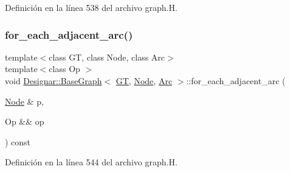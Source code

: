 Definición en la línea 538 del archivo graph.\+H.

\mbox{\label{class_designar_1_1_base_graph_a21553c1d96334e4cf2e0e2086e0efeba}} 
\subsubsection{\texorpdfstring{for\+\_\+each\+\_\+adjacent\+\_\+arc()}{for\_each\_adjacent\_arc()}\hspace{0.1cm}{\footnotesize\ttfamily [2/2]}}
{\footnotesize\ttfamily template$<$class GT, class Node, class Arc$>$ \\
template$<$class Op $>$ \\
void \hyperlink{class_designar_1_1_base_graph}{Designar\+::\+Base\+Graph}$<$ \hyperlink{demo-buildgraph_8_c_a3001c40d2c31ca87ed96cd7d1334a55e}{GT}, \hyperlink{namespace_designar_a5af326c65aa2bd26b26c410f2030d09e}{Node}, \hyperlink{namespace_designar_a3f55fb5513d62ff47cbc8f72b8e95d6f}{Arc} $>$\+::for\+\_\+each\+\_\+adjacent\+\_\+arc (\begin{DoxyParamCaption}\item[{\hyperlink{namespace_designar_a5af326c65aa2bd26b26c410f2030d09e}{Node} \&}]{p,  }\item[{Op \&\&}]{op }\end{DoxyParamCaption}) const\hspace{0.3cm}{\ttfamily [inline]}}



Definición en la línea 544 del archivo graph.\+H.

\mbox{\label{class_designar_1_1_base_graph_ac46a1a7517a6c7029c6bae23d480cfa9}} 
